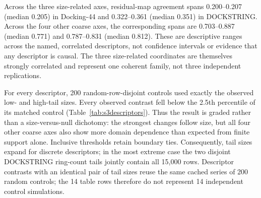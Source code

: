 \documentclass[11pt]{article}
\begin{document}
Across the three size-related axes, residual-map agreement spans
0.200--0.207 (median 0.205) in Docking-44 and 0.322--0.361 (median 0.351) in
DOCKSTRING. Across the four other coarse axes, the corresponding spans are
0.703--0.887 (median 0.771) and 0.787--0.831 (median 0.812). These are
descriptive ranges across the named, correlated descriptors, not confidence
intervals or evidence that any descriptor is causal. The three size-related
coordinates are themselves strongly correlated and represent one coherent
family, not three independent replications.

For every descriptor, 200 random-row-disjoint controls used exactly the
observed low- and high-tail sizes. Every observed contrast fell below the 2.5th
percentile of its matched control (Table~\ref{tab:s3descriptors}). Thus the
result is graded rather than a size-versus-null dichotomy: the strongest changes
follow size, but all four other coarse axes also show more domain dependence
than expected from finite support alone. Inclusive thresholds retain boundary
ties. Consequently, tail sizes expand for discrete descriptors; in the most
extreme case the two disjoint DOCKSTRING ring-count tails jointly contain all
15,000 rows. Descriptor contrasts with an identical pair of tail sizes reuse
the same cached series of 200 random controls; the 14 table rows therefore do
not represent 14 independent control simulations.
\end{document}
